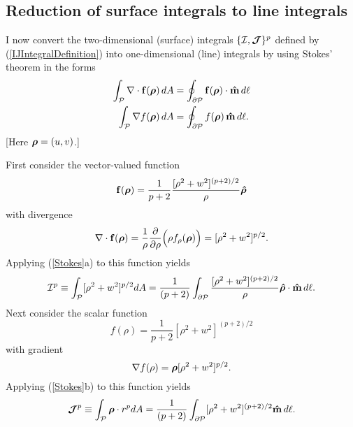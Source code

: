 \documentclass[letterpaper]{article}
\newcommand{\vbhatt}[1]{\boldsymbol{\hat #1}}
\begin{document}
\subsection{Reduction of surface integrals to line integrals}

I now convert the two-dimensional (surface) integrals 
$\{\mathcal{I}, \boldsymbol{\mathcal{J}}\}^p$ defined by (\ref{IJIntegralDefinition})
into one-dimensional (line) integrals by using Stokes' theorem in the forms
\begin{subequations}
\begin{align}
 \int_{\mathcal{P}} \nabla \cdot \mathbf{f}(\boldsymbol{\rho})\,dA
 &=
 \oint_{\partial \mathcal{P}} \mathbf{f}(\boldsymbol{\rho}) \cdot \mathbf{\hat m} \, d\ell
\\
 \int_{\mathcal{P}} \nabla f(\boldsymbol{\rho})\,dA
 &=
 \oint_{\partial \mathcal{P}} f(\boldsymbol{\rho}) \, \mathbf{\hat m} \, d\ell.
\end{align}
\label{Stokes}
\end{subequations}
[Here $\boldsymbol{\rho}=(u,v)$.]

First consider the vector-valued function
$$ \vb f(\vbrho)=
   \frac{1}{p+2}
   \frac{ [\rho^2 + w^2]^{(p+2)/2}}{\rho}\vbhatt{\rho} $$
with divergence
$$
   \nabla \cdot \mathbf{f}(\boldsymbol{\rho})=
   \frac{1}{\rho}\frac{\partial }{\partial \rho}\Big(\rho f_\rho(\boldsymbol{\rho}) \Big)
   = [\rho^2 + w^2]^{p/2}.
$$
Applying (\ref{Stokes}a) to this function yields
$$\mathcal{I}^p
  \equiv \int_{\mc P} [\rho^2 + w^2]^{p/2} dA
  =\frac{1}{(p+2)}\int_{\partial \mc P} 
   \frac{ [\rho^2 + w^2]^{(p+2)/2} } { \rho } 
   \vbhatt{\rho}\cdot\vbhat{m} \, d\ell.
$$
Next consider the scalar function 
$$ f(\rho) = \frac{1}{p+2} [\rho^2 + w^2]^{ (p+2)/2} $$
with gradient
$$ \nabla f(\rho) = \boldsymbol{\rho} [\rho^2 + w^2]^{p/2}.$$
Applying (\ref{Stokes}b) to this function yields
$$\boldsymbol{\mathcal{J}}^p
  \equiv  \int_{\mathcal{P}} \boldsymbol{\rho} \cdot r^p dA
  =\frac{1}{(p+2)}\int_{\partial \mathcal{P}}
   [\rho^2 + w^2]^{(p+2)/2}  \mathbf{\hat m} \, d\ell.
$$
\end{document}
